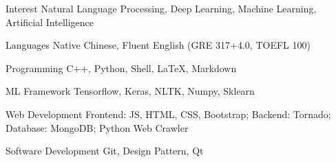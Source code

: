 

\begin{cvskills}


  \cvskill
    {Interest} %
    {Natural Language Processing, Deep Learning, Machine Learning, Artificial Intelligence} %

    

  \cvskill
    {Languages} %
    {Native Chinese, Fluent English (GRE 317+4.0, TOEFL 100)} %


  \cvskill
    {Programming} %
    {C++, Python, Shell, LaTeX, Markdown} %

  \cvskill
    {ML Framework} %
    {Tensorflow, Keras, NLTK, Numpy, Sklearn} %

  \cvskill
    {Web Development} %
    {Frontend: JS, HTML, CSS, Bootstrap; Backend: Tornado; Database: MongoDB; Python Web Crawler} %

  \cvskill
    {Software Development} %
    {Git, Design Pattern, Qt} %

\end{cvskills}
